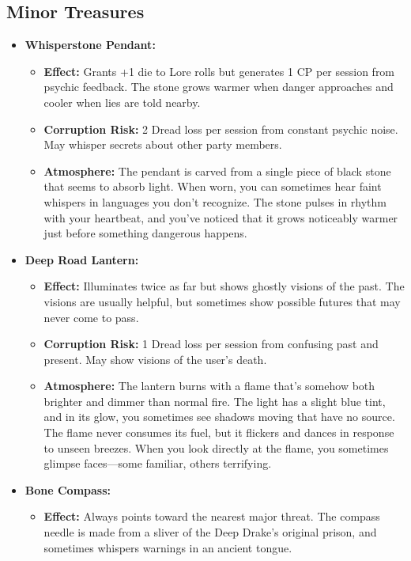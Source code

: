 \documentclass[11pt]{article}
\begin{document}
\subsection{Minor Treasures}
\begin{itemize}
\item \textbf{Whisperstone Pendant:} 
  \begin{itemize}
  \item \textbf{Effect:} Grants +1 die to Lore rolls but generates 1 CP per session from psychic feedback. The stone grows warmer when danger approaches and cooler when lies are told nearby.
  \item \textbf{Corruption Risk:} 2 Dread loss per session from constant psychic noise. May whisper secrets about other party members.
  \item \textbf{Atmosphere:} The pendant is carved from a single piece of black stone that seems to absorb light. When worn, you can sometimes hear faint whispers in languages you don't recognize. The stone pulses in rhythm with your heartbeat, and you've noticed that it grows noticeably warmer just before something dangerous happens.
  \end{itemize}
\item \textbf{Deep Road Lantern:} 
  \begin{itemize}
  \item \textbf{Effect:} Illuminates twice as far but shows ghostly visions of the past. The visions are usually helpful, but sometimes show possible futures that may never come to pass.
  \item \textbf{Corruption Risk:} 1 Dread loss per session from confusing past and present. May show visions of the user's death.
  \item \textbf{Atmosphere:} The lantern burns with a flame that's somehow both brighter and dimmer than normal fire. The light has a slight blue tint, and in its glow, you sometimes see shadows moving that have no source. The flame never consumes its fuel, but it flickers and dances in response to unseen breezes. When you look directly at the flame, you sometimes glimpse faces—some familiar, others terrifying.
  \end{itemize}
\item \textbf{Bone Compass:} 
  \begin{itemize}
  \item \textbf{Effect:} Always points toward the nearest major threat. The compass needle is made from a sliver of the Deep Drake's original prison, and sometimes whispers warnings in an ancient tongue.

\end{itemize}
\end{itemize}
\end{document}
